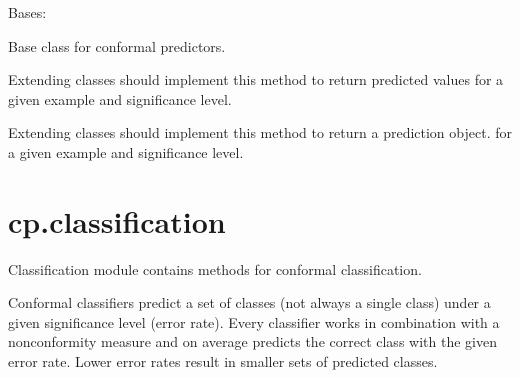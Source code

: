 \documentclass[letterpaper,10pt,english]{sphinxmanual}
\begin{document}
\begin{fulllineitems}
\label{cp.base:cp.base.ConformalPredictor}
Bases: 

Base class for conformal predictors.

\begin{fulllineitems}
\label{cp.base:cp.base.ConformalPredictor.__call__}
Extending classes should implement this method to return predicted values
for a given example and significance level.

\end{fulllineitems}


\begin{fulllineitems}
\label{cp.base:cp.base.ConformalPredictor.predict}
Extending classes should implement this method to return a prediction object.
for a given example and significance level.

\end{fulllineitems}


\end{fulllineitems}



\section{cp.classification}
\label{cp.classification:cp-classification}\label{cp.classification:module-cp.classification}\label{cp.classification::doc}
Classification module contains methods for conformal classification.

Conformal classifiers predict a set of classes (not always a single class) under a given
significance level (error rate). Every classifier works in combination with a nonconformity measure
and on average predicts the correct class with the given error rate. Lower error rates result in
smaller sets of predicted classes.
\end{document}
